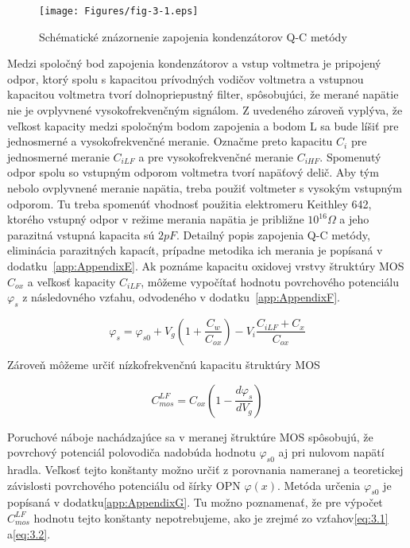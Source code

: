 \begin{figure}[h!]\centering
  \texttt{[image: Figures/fig-3-1.eps]}%
  \caption[Schématické znázornenie zapojenia kondenzátorov Q-C 
metódy]{Schématické znázornenie zapojenia kondenzátorov Q-C 
metódy}\label{fig:3.1}
\end{figure}

Medzi spoločný bod zapojenia kondenzátorov a vstup voltmetra je
pripojený odpor, ktorý spolu s kapacitou prívodných vodičov voltmetra
a vstupnou kapacitou voltmetra tvorí dolnopriepustný filter,
spôsobujúci, že merané napätie nie je ovplyvnené vysokofrekvenčným
signálom. Z uvedeného zároveň vyplýva, že veľkost kapacity medzi
spoločným bodom zapojenia a bodom L sa bude líšiť pre jednosmerné a
vysokofrekvenčné meranie. Označme preto kapacitu $C_i$ pre jednosmerné
meranie $C_{iLF}$ a pre vysokofrekvenčné meranie $C_{iHF}$.  Spomenutý
odpor spolu so vstupným odporom voltmetra tvorí napäťový delič.  Aby
tým nebolo ovplyvnené meranie napätia, treba použiť voltmeter s
vysokým vstupným odporom.  Tu treba spomenúť vhodnosť použitia
elektromeru Keithley 642, ktorého vstupný odpor v režime merania
napätia je približne $10^{16} \Omega$ a jeho parazitná vstupná
kapacita sú $2 pF$. Detailný popis zapojenia Q-C metódy, eliminácia
parazitných kapacít, prípadne metodika ich merania je popísaná v
dodatku~\ref{app:AppendixE}. Ak poznáme kapacitu oxidovej vrstvy
štruktúry MOS $C_{ox}$ a veľkosť kapacity $C_{iLF}$, môžeme vypočítať
hodnotu povrchového potenciálu $\varphi_s$ z následovného vzťahu,
odvodeného v dodatku~\ref{app:AppendixF}.

\begin{equation}
  \varphi_s = \varphi_{s0} + V_g ( 1 + \frac{C_w}{C_{ox}}) - V_i \frac{C_{iLF}+C_x}{C_{ox}}
  \label{eq:3.1}
\end{equation}

Zároveň môžeme určiť nízkofrekvenčnú kapacitu štruktúry MOS

\begin{equation}
  C^{LF}_{mos} = C_{ox} (1 - \frac{d\varphi_s}{dV_g})
  \label{eq:3.2}
\end{equation}

Poruchové náboje nachádzajúce sa v meranej štruktúre MOS spôsobujú, že
povrchový potenciál polovodiča nadobúda hodnotu $\varphi_{s0}$ aj pri
nulovom napätí hradla. Veľkosť tejto konštanty možno určiť z
porovnania nameranej a teoretickej závislosti povrchového potenciálu
od šírky OPN $\varphi(x)$.  Metóda určenia $\varphi_{s0}$ je popísaná
v dodatku\ref{app:AppendixG}. Tu možno poznamenať, že pre výpočet
$C^{LF}_{mos}$ hodnotu tejto konštanty nepotrebujeme, ako je zrejmé zo
vzťahov\ref{eq:3.1} a\ref{eq:3.2}.

